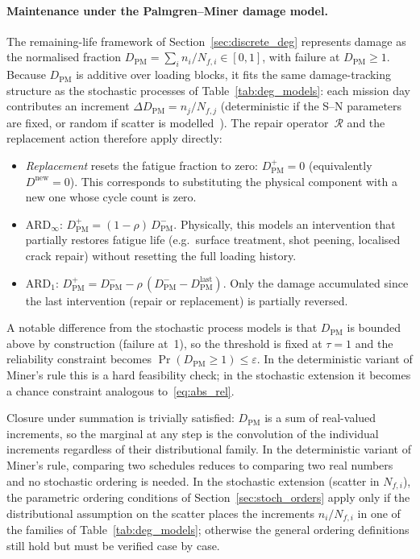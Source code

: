 \documentclass[11pt,a4paper]{article}
\theoremstyle{plain}
\theoremstyle{definition}
\theoremstyle{remark}
\begin{document}
\paragraph{Maintenance under the Palmgren--Miner damage model.}
The remaining-life framework of Section~\ref{sec:discrete_deg} represents damage as the normalised fraction $D_{\mathrm{PM}} = \sum_i n_i/N_{f,i} \in [0,1]$, with failure at $D_{\mathrm{PM}} \ge 1$.
Because $D_{\mathrm{PM}}$ is additive over loading blocks, it fits the same damage-tracking structure as the stochastic processes of Table~\ref{tab:deg_models}: each mission day contributes an increment $\Delta D_{\mathrm{PM}} = n_j / N_{f,j}$ (deterministic if the S--N parameters are fixed, or random if scatter is modelled~\cite{MunizCalvente2022}).
The repair operator~$\mathcal{R}$ and the replacement action therefore apply directly:
\begin{itemize}
  \item \emph{Replacement} resets the fatigue fraction to zero: $D_{\mathrm{PM}}^+ = 0$ (equivalently $D^{\mathrm{new}} = 0$).
    This corresponds to substituting the physical component with a new one whose cycle count is zero.
  \item $\text{ARD}_\infty$: $D_{\mathrm{PM}}^+ = (1-\rho)\,D_{\mathrm{PM}}^-$.
    Physically, this models an intervention that partially restores fatigue life (e.g.\ surface treatment, shot peening, localised crack repair) without resetting the full loading history.
  \item $\text{ARD}_1$: $D_{\mathrm{PM}}^+ = D_{\mathrm{PM}}^- - \rho\,(D_{\mathrm{PM}}^- - D_{\mathrm{PM}}^{\mathrm{last}})$.
    Only the damage accumulated since the last intervention (repair or replacement) is partially reversed.
\end{itemize}
A notable difference from the stochastic process models is that $D_{\mathrm{PM}}$ is bounded above by construction (failure at~1), so the threshold is fixed at $\tau = 1$ and the reliability constraint becomes $\Pr(D_{\mathrm{PM}} \ge 1) \le \varepsilon$.
In the deterministic variant of Miner's rule this is a hard feasibility check; in the stochastic extension it becomes a chance constraint analogous to~\eqref{eq:abs_rel}.

Closure under summation is trivially satisfied: $D_{\mathrm{PM}}$ is a sum of real-valued increments, so the marginal at any step is the convolution of the individual increments regardless of their distributional family.
In the deterministic variant of Miner's rule, comparing two schedules reduces to comparing two real numbers and no stochastic ordering is needed.
In the stochastic extension (scatter in $N_{f,i}$), the parametric ordering conditions of Section~\ref{sec:stoch_orders} apply only if the distributional assumption on the scatter places the increments $n_i/N_{f,i}$ in one of the families of Table~\ref{tab:deg_models}; otherwise the general ordering definitions still hold but must be verified case by case.
\end{document}
